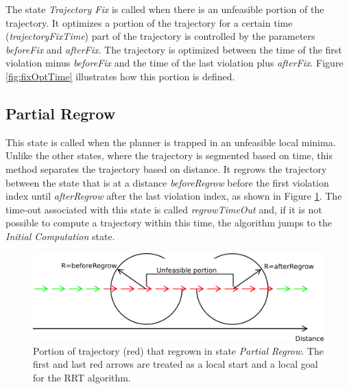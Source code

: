 The state \textit{Trajectory Fix} is called when there is an unfeasible portion of the trajectory. It optimizes a portion of the trajectory for a certain time (\textit{trajectoryFixTime}) part of the trajectory is controlled by the parameters \textit{beforeFix} and \textit{afterFix}. The trajectory is optimized between the time of the first violation minus \textit{beforeFix} and the time of the last violation plus \textit{afterFix}. Figure \ref{fig:fixOptTime} illustrates how this portion is defined.




\subsection{Partial Regrow}
This state is called when the planner is trapped in an unfeasible local minima. Unlike the other states, where the trajectory is segmented based on time, this method separates the trajectory based on distance. It regrows the trajectory between the state that is at a distance \textit{beforeRegrow} before the first violation index until \textit{afterRegrow} after the last violation index, as shown in Figure \ref{fig:regrowDistance}. The time-out associated with this state is called \textit{regrowTimeOut} and, if it is not possible to compute a trajectory within this time, the algorithm jumps to the \textit{Initial Computation} state.

\begin{figure}[H]
   \centering
   \includegraphics[width=0.9\linewidth]{Figures/06_software/regrowDistance.png}
   \caption{Portion of trajectory (red) that regrown in state \textit{Partial Regrow}. The first and last red arrows are treated as a local start and a local goal for the RRT algorithm.}
   \label{fig:regrowDistance}
\end{figure}


